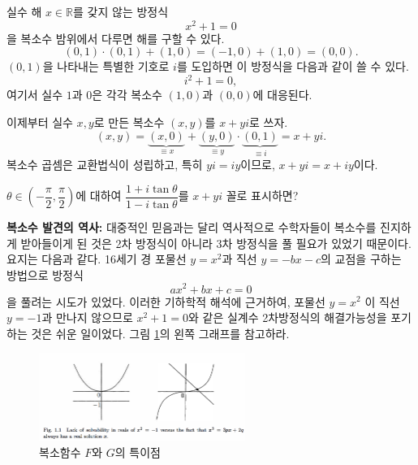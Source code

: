 실수 해 $x\in\mathbb R$를 갖지 않는 방정식
$$
x^2+1=0
$$
을 복소수 밤위에서 다루면 해를 구할 수 있다.
$$
(0,1)\cdot (0,1) + (1,0) = (-1,0) + (1,0) = (0,0).
$$
$(0,1)$을 나타내는 특별한 기호로 $i$를 도입하면 이 방정식을 다음과 같이 쓸 수 있다.
$$
i^2+1=0,
$$
여기서 실수 $1$과 $0$은 각각 복소수 $(1,0)$과 $(0,0)$에 대응된다.

이제부터 실수  $x,y$로 만든 복소수 $(x,y)$를 $x+yi$로 쓰자.
$$
(x,y) = \underbrace{(x,0)}_{\equiv x} +  \underbrace{(y,0)}_{\equiv y}
\cdot  \underbrace{(0,1)}_{\equiv i} = x+yi.
$$
복소수 곱셈은 교환법식이 성립하고, 특히 $yi = iy$이므로,
$x+yi = x+iy$이다.

\begin{salt_exercise} %
$\theta \in \left(-\dfrac{\pi}2, \dfrac\pi2 \right)$에 대하여
$\dfrac{1+i\tan\theta}{1-i\tan\theta}$를 $x+yi$ 꼴로 표시하면?
\end{salt_exercise}

{\bf 복소수 발견의 역사: }
대중적인 믿음과는 달리 역사적으로 수학자들이 복소수를 진지하게 받아들이게 된 것은 
2차 방정식이 아니라 3차 방정식을 풀 필요가 있었기 때문이다. 요지는 다음과 같다.
16세기 경 포물선 $y=x^2$과 직선 $y=-bx-c$의 교점을 구하는  방법으로 
 방정식
$$
ax^2 + bx + c = 0
$$
을 풀려는 시도가 있었다. 
이러한 기하학적 해석에 근거하여,
포물선  $y=x^2$ 이 직선 $y=-1$과 만나지 않으므로
$x^2+1=0$와 같은 실계수 2차방정식의 해결가능성을 포기하는 것은 쉬운 일이었다.
그림 \ref{fig-1-1}의 왼쪽 그래프를 참고하라.

\begin{figure}[!h]
\begin{center}
\includegraphics[width=0.6\textwidth]{./SaltChapter/preface-fig-1-1}
\end{center}
\caption{복소함수 $F$와 $G$의 특이점}
\label{fig-1-1}
\end{figure}





